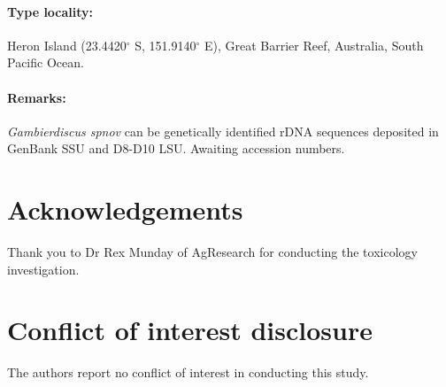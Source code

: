 \documentclass[12pt]{article}
\begin{document}
\paragraph{Type locality:} Heron Island (23.4420$^{\circ}$ S, 151.9140$^{\circ}$ E), Great Barrier Reef, Australia, South Pacific Ocean.
\paragraph{Remarks:} \emph{Gambierdiscus spnov} can be genetically identified rDNA sequences deposited in GenBank SSU and D8-D10 LSU. Awaiting accession numbers.

\newpage
\section{Acknowledgements}
Thank you to Dr Rex Munday of AgResearch for conducting the toxicology investigation.

\section{Conflict of interest disclosure}
The authors report no conflict of interest in conducting this study.
\newpage
\end{document}
